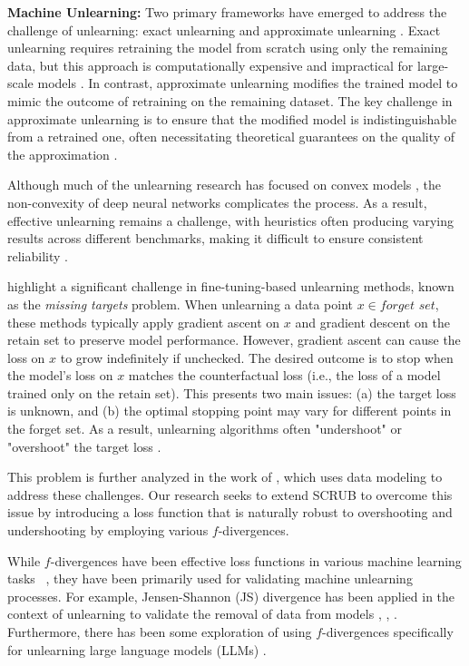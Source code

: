 \documentclass{article}
\begin{document}
\textbf{Machine Unlearning:} Two primary frameworks have emerged to address the challenge of unlearning: exact unlearning \citep{cao2015towards} and approximate unlearning \citep{nguyen2020variational}. Exact unlearning requires retraining the model from scratch using only the remaining data, but this approach is computationally expensive and impractical for large-scale models \citep{thudi2022unrolling}. In contrast, approximate unlearning modifies the trained model to mimic the outcome of retraining on the remaining dataset. The key challenge in approximate unlearning is to ensure that the modified model is indistinguishable from a retrained one, often necessitating theoretical guarantees on the quality of the approximation \citep{guo2019certified}.

Although much of the unlearning research has focused on convex models \citep{sekhari2021rememberwantforgetalgorithms}, the non-convexity of deep neural networks complicates the process. As a result, effective unlearning remains a challenge, with heuristics often producing varying results across different benchmarks, making it difficult to ensure consistent reliability \citep{li2024machine}.

\citep{hayes2024} highlight a significant challenge in fine-tuning-based unlearning methods, known as the \textit{missing targets} problem. When unlearning a data point $x \in \textit{forget set}$, these methods typically apply gradient ascent on $x$ and gradient descent on the retain set to preserve model performance. However, gradient ascent can cause the loss on $x$ to grow indefinitely if unchecked. The desired outcome is to stop when the model's loss on $x$ matches the counterfactual loss (i.e., the loss of a model trained only on the retain set). This presents two main issues: (a) the target loss is unknown, and (b) the optimal stopping point may vary for different points in the forget set. As a result, unlearning algorithms often "undershoot" or "overshoot" the target loss \citep{hayes2024}.

This problem is further analyzed in the work of \citep{georgiev2024attributetodeletemachineunlearningdatamodel}, which uses data modeling to address these challenges. Our research seeks to extend SCRUB to overcome this issue by introducing a loss function that is naturally robust to overshooting and undershooting by employing various $f$-divergences.

While $f$-divergences have been effective loss functions in various machine learning tasks ~\citep{aminian2024robustsemisupervisedlearningfdivergence,roulet2025lossfunctionsoperatorsgenerated,novello2024fdivergencebasedclassificationuse,wang2023reverseklgeneralizingdirect}, they have been primarily used for validating machine unlearning processes. For example, Jensen-Shannon (JS) divergence has been applied in the context of unlearning to validate the removal of data from models \citep{bonato2025retain}, \citep{jeon2024information}, \citep{rangel2024learning}. Furthermore, there has been some exploration of using $f$-divergences specifically for unlearning large language models (LLMs) \citep{wang2024llm}.
\end{document}

